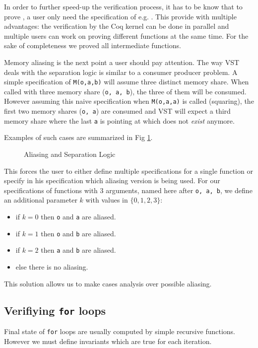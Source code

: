 In order to further speed-up the verification process, it has to be know that to
prove , a user only need the specification of e.g. .
This provide with multiple advantages: the verification by the Coq kernel can be done
in parallel and multiple users can work on proving different functions at the same time.
For the sake of completeness we proved all intermediate functions.

Memory aliasing is the next point a user should pay attention. The way VST
deals with the separation logic is similar to a consumer producer problem.
A simple specification of \texttt{M(o,a,b)} will assume three distinct memory share.
When called with three memory share (\texttt{o, a, b}), the three of them will be consumed.
However assuming this naive specification when \texttt{M(o,a,a)} is called (squaring),
the first two memory shares (\texttt{o, a}) are consumed and VST will expect a third
memory share where the last \texttt{a} is pointing at which does not \textit{exist} anymore.

Examples of such cases are summarized in Fig \ref{tk:MemSame}.
\begin{figure}[h]
  
  \caption{Aliasing and Separation Logic}
  \label{tk:MemSame}
\end{figure}

This forces the user to either define multiple specifications for a single function
or specify in his specification which aliasing version is being used.
For our specifications of functions with 3 arguments, named here after \texttt{o, a, b},
we define an additional parameter $k$ with values in
$\{0,1,2,3\}$:
\begin{itemize}
  \item if $k=0$ then \texttt{o} and \texttt{a} are aliased.
  \item if $k=1$ then \texttt{o} and \texttt{b} are aliased.
  \item if $k=2$ then \texttt{a} and \texttt{b} are aliased.
  \item else there is no aliasing.
\end{itemize}
This solution allows us to make cases analysis over possible aliasing.

\subsection{Verifiying \texttt{for} loops}

Final state of \texttt{for} loops are usually computed by simple recursive functions.
However we must define invariants which are true for each iteration.

